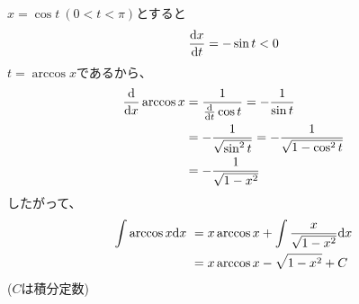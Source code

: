 \documentclass[letterpaper,10pt,english]{sphinxmanual}
\begin{document}
\(x = \cos t \ (0< t< \pi)\)とすると
\begin{gather}
\begin{split}\frac{\mathrm{d}x}{\mathrm{d}t} = - \sin t < 0\end{split}\notag
\end{gather}
\(t = \arccos x\)であるから、
\begin{gather}
\begin{split}\begin{align}
\frac{\mathrm{d}}{\mathrm{d}x}\arccos x &= \frac{1}{\frac{\mathrm{d}}{\mathrm{d}t}\cos t} = -\frac{1}{\sin t}\\
&=- \frac{1}{\sqrt{\sin^{2}t}} = - \frac{1}{\sqrt{1- \cos^{2}t}} \\
&= - \frac{1}{\sqrt{1- x^{2}}}
\end{align}\end{split}\notag
\end{gather}
したがって、
\begin{gather}
\begin{split}\begin{align}
\int \arccos x \mathrm{d}x\  &= x\arccos x + \int \frac{x}{\sqrt{1-x^{2}}}\mathrm{d}x\\
&=x\arccos x - \sqrt{1-x^{2}} + C
\end{align}\end{split}\notag
\end{gather}
(\(C\)は積分定数)
\end{document}
